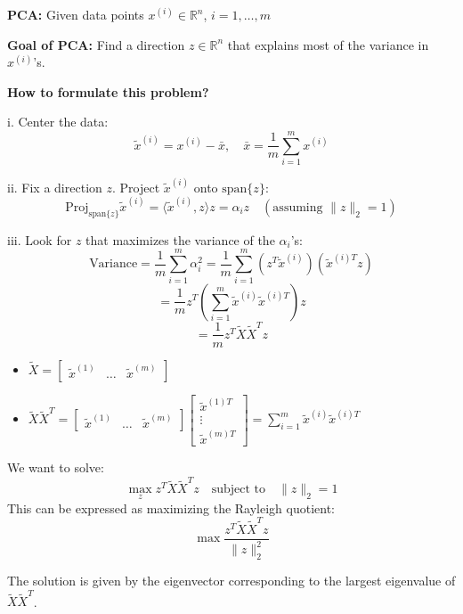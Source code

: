 \begin{intuition}
\textbf{PCA:}
Given data points \( x^{(i)} \in \mathbb{R}^n \), $i=1,\ldots,m$
\vspace{1em}

 \textbf{Goal of PCA:} Find a direction \( z \in \mathbb{R}^n \) that explains most of the variance in \( x^{(i)} \)'s.
\vspace{1em}

\textbf{How to formulate this problem?}

i. Center the data:
\[
\tilde{x}^{(i)} = x^{(i)} - \bar{x}, \quad \bar{x} = \frac{1}{m} \sum_{i=1}^{m} x^{(i)}
\]

ii. Fix a direction \( z \). Project \( \tilde{x}^{(i)} \) onto \( \text{span}\{z\} \):
\[
\text{Proj}_{\text{span}\{z\}} \tilde{x}^{(i)} = \langle \tilde{x}^{(i)}, z \rangle z = \alpha_i z \quad (\text{assuming } \|z\|_2 = 1)
\]

iii. Look for $z$ that maximizes the variance of the \( \alpha_i \)'s:
\[
\text{Variance} = \frac{1}{m} \sum_{i=1}^{m} \alpha_i^2 = \frac{1}{m} \sum_{i=1}^{m} \left( z^T \tilde{x}^{(i)} \right) \left( \tilde{x}^{(i)T} z \right)
\]
\[
= \frac{1}{m} z^T \left( \sum_{i=1}^{m} \tilde{x}^{(i)} \tilde{x}^{(i)T} \right) z
\]
\[
= \frac{1}{m} z^T \tilde{X} \tilde{X}^T z
\]
\begin{itemize}
    \item $\tilde{X} = \begin{bmatrix} \tilde{x}^{(1)} & \ldots & \tilde{x}^{(m)} \end{bmatrix}$
    \item $
\tilde{X} \tilde{X}^T = 
\begin{bmatrix}
\tilde{x}^{(1)} & \ldots & \tilde{x}^{(m)}
\end{bmatrix}
\begin{bmatrix}
\tilde{x}^{(1)T} \\
\vdots \\
\tilde{x}^{(m)T}
\end{bmatrix}
= \sum_{i=1}^{m} \tilde{x}^{(i)} \tilde{x}^{(i)T}$
\end{itemize}

We want to solve:
\[
\max_{z} z^T \tilde{X} \tilde{X}^T z \quad \text{subject to} \quad \|z\|_2 = 1
\]
This can be expressed as maximizing the Rayleigh quotient:
\[
\max \frac{z^T \tilde{X} \tilde{X}^T z}{\|z\|_2^2}
\]

The solution is given by the eigenvector corresponding to the largest eigenvalue of \( \tilde{X} \tilde{X}^T \).


\end{intuition}
